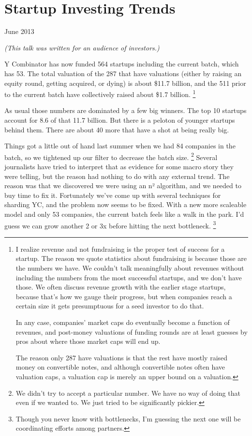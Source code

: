 \chapter{Startup Investing Trends}

June 2013

\emph{(This talk was written for an audience of investors.)}

Y Combinator has now funded 564 startups including the current batch,
which has 53. The total valuation of the 287 that have valuations
(either by raising an equity round, getting acquired, or dying) is about
\$11.7 billion, and the 511 prior to the current batch have collectively
raised about \$1.7 billion. \footnote{I realize revenue and not fundraising is the proper test of
success for a startup. The reason we quote statistics about fundraising
is because those are the numbers we have. We couldn't talk meaningfully
about revenues without including the numbers from the most successful
startups, and we don't have those. We often discuss revenue growth with
the earlier stage startups, because that's how we gauge their progress,
but when companies reach a certain size it gets presumptuous for a seed
investor to do that.

In any case, companies' market caps do eventually become a function of
revenues, and post-money valuations of funding rounds are at least
guesses by pros about where those market caps will end up.

The reason only 287 have valuations is that the rest have mostly raised
money on convertible notes, and although convertible notes often have
valuation caps, a valuation cap is merely an upper bound on a valuation.}

As usual those numbers are dominated by a few big winners. The top 10
startups account for 8.6 of that 11.7 billion. But there is a peloton of
younger startups behind them. There are about 40 more that have a shot
at being really big.

Things got a little out of hand last summer when we had 84 companies in
the batch, so we tightened up our filter to decrease the batch size.
\footnote{We didn't try to accept a particular number. We have no way of
doing that even if we wanted to. We just tried to be significantly
pickier.} Several journalists have tried to interpret that
as evidence for some macro story they were telling, but the reason had
nothing to do with any external trend. The reason was that we discovered
we were using an n² algorithm, and we needed to buy time to fix it.
Fortunately we've come up with several techniques for sharding YC, and
the problem now seems to be fixed. With a new more scaleable model and
only 53 companies, the current batch feels like a walk in the park. I'd
guess we can grow another 2 or 3x before hitting the next bottleneck.
\footnote{Though you never know with bottlenecks, I'm guessing the next
one will be coordinating efforts among partners.}

